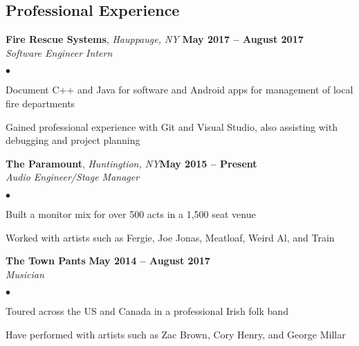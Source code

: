 \documentclass[margin,line]{res}
\newenvironment{list2}{
  \begin{list}{$\bullet$}{
      \setlength{\itemsep}{0in}
      \setlength{\parsep}{0in} \setlength{\parskip}{0in}
      \setlength{\topsep}{0in} \setlength{\partopsep}{0in}
      \setlength{\leftmargin}{0.2in}}}{\end{list}}
\begin{document}
\begin{resume}
\section{\sc Professional Experience}
{\bf Fire Rescue Systems}, \textit{Hauppauge, NY} \hfill {\bf May 2017 -- August 2017}\\
{\em Software Engineer Intern}
\begin{list2} %
\item Document C++ and Java for software and Android apps for management of local fire departments
\item Gained professional experience with Git and Visual Studio, also assisting with debugging and project planning
\end{list2}
{\bf The Paramount}, \textit{Huntingtion, NY}\hfill {\bf May 2015 -- Present}\\
{\em Audio Engineer/Stage Manager}
\begin{list2} %
\item Built a monitor mix for over 500 acts in a 1,500 seat venue
\item Worked with artists such as Fergie, Joe Jonas, Meatloaf, Weird Al, and Train
\end{list2}
{\bf The Town Pants} \hfill {\bf May 2014 -- August 2017}\\
{\em Musician}
\begin{list2} %
\item Toured across the US and Canada in a professional Irish folk band
\item Have performed with artists such as Zac Brown, Cory Henry, and George Millar
\end{list2}




\end{resume}
\end{document}
